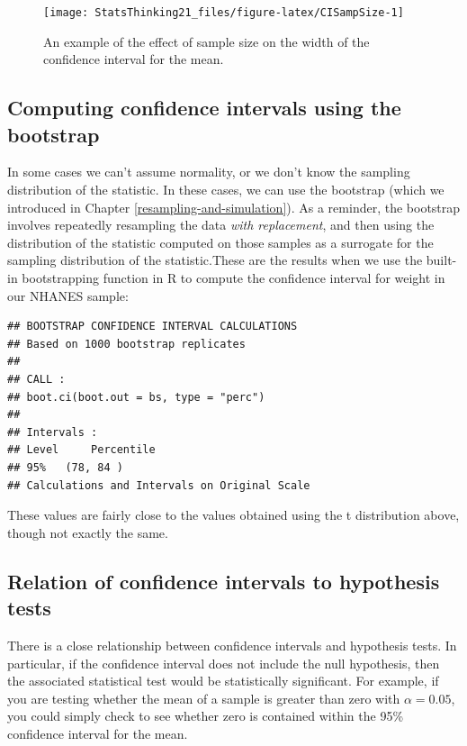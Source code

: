 \documentclass[
  12pt,
]{book}
\begin{document}
\begin{figure}
\texttt{[image: StatsThinking21\_files/figure-latex/CISampSize-1]} \caption{An example of the effect of sample size on the width of the confidence interval for the mean.}\label{fig:CISampSize}
\end{figure}

\hypertarget{computing-confidence-intervals-using-the-bootstrap}{%
\subsection{Computing confidence intervals using the bootstrap}\label{computing-confidence-intervals-using-the-bootstrap}}

In some cases we can't assume normality, or we don't know the sampling distribution of the statistic. In these cases, we can use the bootstrap (which we introduced in Chapter \ref{resampling-and-simulation}). As a reminder, the bootstrap involves repeatedly resampling the data \emph{with replacement}, and then using the distribution of the statistic computed on those samples as a surrogate for the sampling distribution of the statistic.These are the results when we use the built-in bootstrapping function in R to compute the confidence interval for weight in our NHANES sample:

\begin{verbatim}
## BOOTSTRAP CONFIDENCE INTERVAL CALCULATIONS
## Based on 1000 bootstrap replicates
## 
## CALL : 
## boot.ci(boot.out = bs, type = "perc")
## 
## Intervals : 
## Level     Percentile     
## 95%   (78, 84 )  
## Calculations and Intervals on Original Scale
\end{verbatim}

These values are fairly close to the values obtained using the t distribution above, though not exactly the same.

\hypertarget{relation-of-confidence-intervals-to-hypothesis-tests}{%
\subsection{Relation of confidence intervals to hypothesis tests}\label{relation-of-confidence-intervals-to-hypothesis-tests}}

There is a close relationship between confidence intervals and hypothesis tests. In particular, if the confidence interval does not include the null hypothesis, then the associated statistical test would be statistically significant. For example, if you are testing whether the mean of a sample is greater than zero with \(\alpha = 0.05\), you could simply check to see whether zero is contained within the 95\% confidence interval for the mean.
\end{document}
